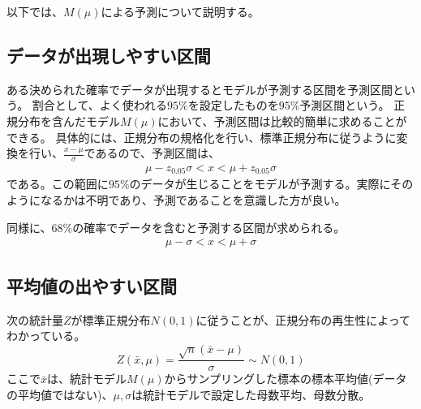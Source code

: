 以下では、$M(\mu)$による予測について説明する。


\subsection{データが出現しやすい区間}
ある決められた確率でデータが出現するとモデルが予測する区間を予測区間という。
割合として、よく使われる$95\%$を設定したものを$95\%$予測区間という。
正規分布を含んだモデル$M(\mu)$において、予測区間は比較的簡単に求めることができる。
具体的には、正規分布の規格化を行い、標準正規分布に従うように変換を行い、$\frac{x-\mu}{\sigma}$であるので、予測区間は、
\begin{eqnarray*}
    \mu-z_{0.05}\sigma < x < \mu+z_{0.05}\sigma
\end{eqnarray*}
である。この範囲に$95\%$のデータが生じることをモデルが予測する。実際にそのようになるかは不明であり、予測であることを意識した方が良い。

同様に、$68\%$の確率でデータを含むと予測する区間が求められる。
\begin{eqnarray*}
    \mu-\sigma < x < \mu+\sigma
\end{eqnarray*}






\subsection{平均値の出やすい区間}
次の統計量$Z$が標準正規分布$N(0,1)$に従うことが、正規分布の再生性によってわかっている。
$$
Z(\bar{x},\mu)=\frac{\sqrt{n}(\bar{x}-\mu)}{\sigma} \sim N(0,1)
$$
ここで$\bar{x}$は、統計モデル$M(\mu)$からサンプリングした標本の標本平均値(データの平均値ではない)、$\mu,\sigma$は統計モデルで設定した母数平均、母数分散。

